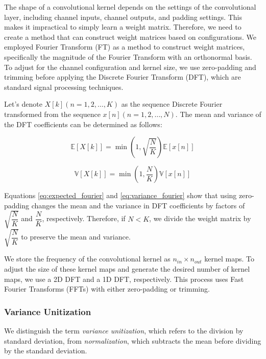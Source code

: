 \documentclass[lettersize,journal]{IEEEtran}
\begin{document}
    The shape of a convolutional kernel depends on the settings of the convolutional layer, including channel inputs, channel outputs, and padding settings. This makes it impractical to simply learn a weight matrix. Therefore, we need to create a method that can construct weight matrices based on configurations. We employed Fourier Transform (FT) as a method to construct weight matrices, specifically the magnitude of the Fourier Transform with an orthonormal basis. To adjust for the channel configuration and kernel size, we use zero-padding and trimming before applying the Discrete Fourier Transform (DFT), which are standard signal processing techniques.
    
    Let's denote $X[k](n=1,2,\dots, K)$ as the sequence Discrete Fourier transformed from the sequence $x[n](n=1,2,\dots, N)$. The mean and variance of the DFT coefficients can be determined as follows:
    
    \begin{equation} \label{eq:expected_fourier}
    \mathbb E\left[X[k]\right] = \min{\left(1, \sqrt{\frac{N}{K}}\right)} \mathbb E\left[x[n]\right]
    \end{equation}
    
    \begin{equation} \label{eq:variance_fourier}
    \mathbb V\left[X[k]\right] = \min{\left(1, \frac{N}{K}\right)} \mathbb V\left[x[n]\right]
    \end{equation}
    
    Equations \ref{eq:expected_fourier} and \ref{eq:variance_fourier} show that using zero-padding changes the mean and the variance in DFT coefficients by factors of $\sqrt{\dfrac{N}{K}}$ and $\dfrac{N}{K}$, respectively. Therefore, if $N < K$, we divide the weight matrix by $\sqrt{\dfrac{N}{K}}$ to preserve the mean and variance.
    
    We store the frequency of the convolutional kernel as $n_{in} \times n_{out}$ kernel maps. To adjust the size of these kernel maps and generate the desired number of kernel maps, we use a 2D DFT and a 1D DFT, respectively. This process uses Fast Fourier Transforms (FFTs) with either zero-padding or trimming.

    \subsubsection{Variance Unitization}
        We distinguish the term \emph{variance unitization}, which refers to the division by standard deviation, from \emph{normalization}, which subtracts the mean before dividing by the standard deviation.
        
\end{document}
